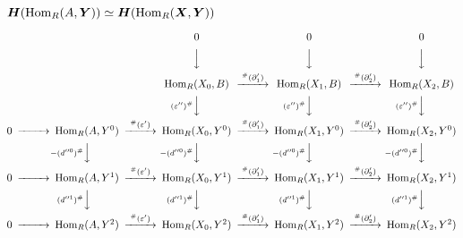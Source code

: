 \begin{screen}
  $\boldsymbol{H}(\operatorname{Hom}_R(A, \boldsymbol{Y})) \simeq \boldsymbol{H}(\operatorname{Hom}_R(\boldsymbol{X}, \boldsymbol{Y}))$
\end{screen}
\[
\begin{CD}
  @. @. 0 @. 0 @. 0 \\
  @. @. @VVV @VVV @VVV \\
  @. @. \Hom_R(X_0, B) @>{^\#(\partial_1')}>> \Hom_R(X_1, B) @>{^\#(\partial_2')}>> \Hom_R(X_2, B) \\
  @. @. @V{(\varepsilon'')^\#}VV @V{(\varepsilon'')^\#}VV @V{(\varepsilon'')^\#}VV \\
  0 @>>> \Hom_R(A, Y^0) @>{^\#(\varepsilon')}>> \Hom_R(X_0, Y^0) @>{^\#(\partial_1')}>> \Hom_R(X_1, Y^0) @>{^\#(\partial_2')}>> \Hom_R(X_2, Y^0) \\
  @. @V{-(d''^0)^\#}VV @V{-(d''^0)^\#}VV @V{-(d''^0)^\#}VV @V{-(d''^0)^\#}VV \\
  0 @>>> \Hom_R(A, Y^1) @>{^\#(\varepsilon')}>> \Hom_R(X_0, Y^1) @>{^\#(\partial_1')}>> \Hom_R(X_1, Y^1) @>{^\#(\partial_2')}>> \Hom_R(X_2, Y^1) \\
  @. @V{(d''^1)^\#}VV @V{(d''^1)^\#}VV @V{(d''^1)^\#}VV @V{(d''^1)^\#}VV \\
  0 @>>> \Hom_R(A, Y^2) @>{^\#(\varepsilon')}>> \Hom_R(X_0, Y^2) @>{^\#(\partial_1')}>> \Hom_R(X_1, Y^2) @>{^\#(\partial_2')}>> \Hom_R(X_2, Y^2)
\end{CD}
\]
